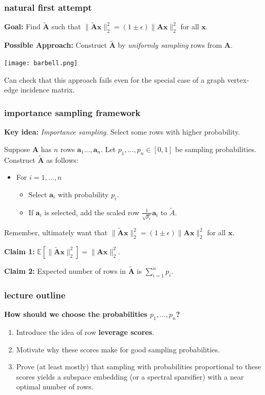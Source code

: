 \documentclass[compress]{beamer}
\newcommand{\bv}[1]{\mathbf{#1}}
\newcommand{\E}{\mathbb{E}}
\begin{document}
\begin{frame}[t]
	\frametitle{natural first attempt}
	\textbf{Goal:} Find $\tilde{\bv{A}}$ such that $\|\tilde{\bv{A}}\bv{x}\|_2^2 = (1\pm \epsilon)\|{\bv{A}}\bv{x}\|_2^2$ for all $\bv{x}$. 
	
	\textbf{Possible Approach:} Construct ${\tilde{\bv{A}}}$ by \emph{uniformly sampling} rows from $\bv{A}$. 
	
	\vspace{-2.5em}
	\begin{center}
		\texttt{[image: barbell.png]}
		
		\vspace{-1.5em}
		Can check that this approach fails even for the special case of a graph vertex-edge incidence matrix. 
	\end{center}	
\end{frame}

\begin{frame}[t]
	\frametitle{importance sampling framework}
	\textbf{Key idea:} \emph{Importance sampling}. Select some rows with higher probability. 
	
	Suppose $\bv{A}$ has $n$ rows $\bv{a}_1\ldots, \bv{a}_n$. Let $p_1, \ldots, p_n \in [0,1]$ be sampling probabilities. Construct $\tilde{\bv{A}}$ as follows:
	\begin{itemize}
		\item For $i = 1,\ldots, n$
		\begin{itemize}
			\item Select $\bv{a}_i$ with probability $p_i$. 
			\item If $\bv{a}_i$ is selected, add the scaled row $\frac{1}{\sqrt{p_i}} \bv{a}_i$ to $\tilde{A}$. 
		\end{itemize}
	\end{itemize}
Remember, ultimately want that $\|\tilde{\bv{A}}\bv{x}\|_2^2 = (1\pm \epsilon)\|{\bv{A}}\bv{x}\|_2^2$ for all $\bv{x}$. 

	\textbf{Claim 1:} $\E[\|\tilde{\bv{A}}\bv{x}\|_2^2] = \|{\bv{A}}\bv{x}\|_2^2$. 
	\vspace{2em}
	
	
	\textbf{Claim 2:} Expected number of rows in $\tilde{\bv{A}}$ is $\sum_{i=1}^n p_i$. 
\end{frame}

\begin{frame}[t]
	\frametitle{lecture outline}
	\begin{center}
		\alert{\textbf{How should we choose the probabilities $p_1, \ldots, p_n$?}}
	\end{center}
	\begin{enumerate}
		\item Introduce the idea of row \textbf{leverage scores}. 
		\item Motivate why these scores make for good sampling probabilities. 
		\item Prove (at least mostly) that sampling with probabilities proportional to these scores yields a subspace embedding (or a spectral sparsifier) with a near optimal number of rows.
	\end{enumerate}
\end{frame}
\end{document}

